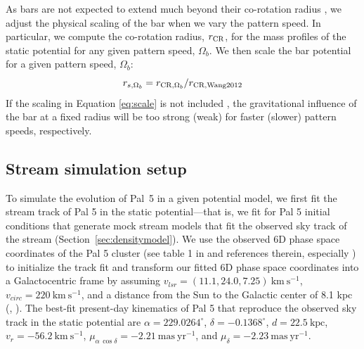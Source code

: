 \documentclass[twocolumn]{aastex62}
\newcommand{\msun}{\textrm{M}_\odot}
\newcommand{\kpc}{\textrm{kpc}}
\newcommand{\kms}{\ensuremath{\textrm{km}~\textrm{s}^{-1}}}
\newcommand{\masyr}{\ensuremath{\textrm{mas}~\textrm{yr}^{-1}}}
\newcommand{\todo}[1]{{\color{red} TODO: #1}}
\begin{document}
As bars are not expected to extend much beyond their co-rotation radius \citep[e.g.,][]{weiner:1999, Debattista:2002, Debattista:2002b}, we adjust the physical scaling of the bar when we vary the pattern speed. %
In particular, we compute the co-rotation radius, $r_{\rm CR}$, for the mass profiles of the static potential for any given pattern speed, $\Omega_b$.
We then scale the bar potential for a given pattern speed, $\Omega_b$:
\begin{equation}\label{eq:scale}
r_{s, \Omega_b}  = r_{{\rm CR}, \Omega_b}/r_{{\rm CR, Wang 2012}}
\end{equation}
If the scaling in Equation \ref{eq:scale} is not included \citep[as in, e.g.,][]{Pearson:2017, Erkal:2017, Banik:2019}, the gravitational influence of the bar at a fixed radius will be too strong (weak) for faster (slower) pattern speeds, respectively.

%


\subsection{Stream simulation setup}
\label{sec:modeling}

To simulate the evolution of Pal~5 in a given potential model, we first fit the stream track of Pal 5 in the static potential---that is, we fit for Pal 5 initial conditions that generate mock stream models that fit the observed sky track of the stream (Section~\ref{sec:densitymodel}).
We use the observed 6D phase space coordinates of the Pal 5 cluster (see table 1 in \citealt{Pearson:2017} and references therein, especially \citealt{Fritz:2015}) to initialize the track fit and transform our fitted 6D phase space coordinates into a Galactocentric frame by assuming $v_{lsr} = (11.1, 24.0, 7.25) ~\kms$,  $v_{circ} = 220~\kms$, and a distance from the Sun to the Galactic center of 8.1 kpc (\citealt{Schonrich:2010}, \citealt{Schonrich:2012}).
The best-fit present-day kinematics of Pal 5 that reproduce the observed sky track in the static potential are $\alpha = 229.0264^\circ$, $\delta = -0.1368^\circ$, $d = 22.5~\kpc$, $v_r = -56.2~\kms$, $\mu_{\alpha\,\cos\delta} = -2.21~\masyr$, and $\mu_\delta = -2.23~\masyr$.
\end{document}
